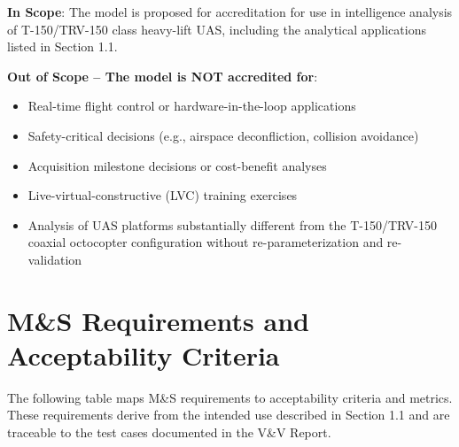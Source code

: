 \documentclass[11pt, letterpaper]{article}
\begin{document}
\unclass \textbf{In Scope}: The model is proposed for accreditation for use in intelligence analysis of T-150/TRV-150 class heavy-lift UAS, including the analytical applications listed in Section 1.1.

\unclass \textbf{Out of Scope -- The model is NOT accredited for}:

\begin{itemize}
    \item \unclass Real-time flight control or hardware-in-the-loop applications
    \item \unclass Safety-critical decisions (e.g., airspace deconfliction, collision avoidance)
    \item \unclass Acquisition milestone decisions or cost-benefit analyses
    \item \unclass Live-virtual-constructive (LVC) training exercises
    \item \unclass Analysis of UAS platforms substantially different from the T-150/TRV-150 coaxial octocopter configuration without re-parameterization and re-validation
\end{itemize}

\pagebreak


\section{\unclass M\&S Requirements and Acceptability Criteria}

\unclass The following table maps M\&S requirements to acceptability criteria and metrics. These requirements derive from the intended use described in Section 1.1 and are traceable to the test cases documented in the V\&V Report.
\end{document}
